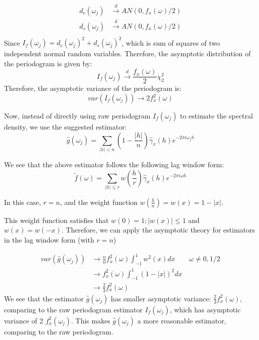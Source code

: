 \begin{equation}
\begin{split}
d_c(\omega_j) &\xrightarrow{d} AN(0, f_x(\omega)/2) \\
d_s(\omega_j) &\xrightarrow{d} AN(0, f_x(\omega)/2) \\
\end{split}
\end{equation}
Since $I_f(\omega_j) = d_c(\omega_j)^2 + d_s(\omega_j)^2$, which is sum of squares of two independent normal random variables. Therefore, the asymptotic distribution of the periodogram is given by:
\begin{equation}
I_f(\omega_j) \xrightarrow{d} \frac{f_x(\omega)}{2} \chi^2_2
\end{equation}
Therefore, the asymptotic variance of the periodogram is:
\begin{equation}
var(I_f(\omega_j)) \rightarrow 2 f^2_x(\omega)
\end{equation} 

Now, instead of directly using raw periodogram $I_f(\omega_j)$ to estimate the spectral density, we use the suggested estimator:
\begin{equation}
\hat{g}(\omega_j) = \sum_{|h|<n}(1-\frac{|h|}{n})\hat{\gamma}_x(h)e^{-2\pi i \omega_j h}
\end{equation}

We see that the above estimator follows the following lag window form:
\begin{equation}
\tilde{f}(\omega) = \sum_{|h|\leq r}w(\frac{h}{r})\hat{\gamma}_x(h)e^{-2\pi i \omega h}
\end{equation}

In this case, $r = n$, and the weight function $w(\frac{h}{n}) = w(x) = 1-|x|$.

This weight function satisfies that $w(0) = 1; |w(x)| \leq 1$ and $w(x) = w(-x)$. Therefore, we can apply the asymptotic theory for estimators in the lag window form (with $r = n$)

\begin{equation}
\begin{split}
 var(\hat{g}(\omega_j) ) &\rightarrow \frac{n}{n} f_x^2(\omega) \int_{-1}^{1}w^2(x) dx \qquad \omega \neq 0, 1/2 \\
&\rightarrow  f_x^2(\omega) \int_{-1}^{1}(1-|x|)^2 dx \\
&\rightarrow \frac{2}{3} f_x^2(\omega) 
\end{split}
\end{equation}
We see that the estimator $\hat{g}(\omega_j)$ has smaller asymptotic variance: $\frac{2}{3} f_x^2(\omega)$, comparing to the raw periodogram estimator $I_f(\omega_j)$, which has asymptotic variance of 2 $f^2_x(\omega_j)$. This makes $\hat{g}(\omega_j)$ a more reasonable estimator, comparing to the raw periodogram.

